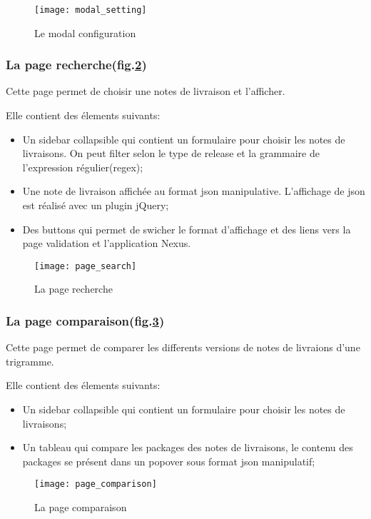 \begin{figure}[ht]
 \centering
 \texttt{[image: modal\_setting]}
 \caption{Le modal configuration}
 \label{fig:modal_setting}
\end{figure}

\subsubsection{La page recherche(fig.\ref{fig:page_search})}
Cette page permet de choisir une notes de livraison et l'afficher.

Elle contient des élements suivants:
\begin{itemize}
 \item Un sidebar collapsible qui contient un formulaire pour choisir les notes de livraisons. On peut filter selon le type de release et la grammaire de l'expression régulier(regex);
 \item Une note de livraison affichée au format json manipulative. L'affichage de json est réalisé avec un plugin jQuery;
 \item Des buttons qui permet de swicher le format d'affichage et des liens vers la page validation et l'application Nexus.
\end{itemize}

\begin{figure}[ht]
 \centering
 \texttt{[image: page\_search]}
 \caption{La page recherche}
 \label{fig:page_search}
\end{figure}

\subsubsection{La page comparaison(fig.\ref{fig:page_comparaison})}
Cette page permet de comparer les differents versions de notes de livraions d'une trigramme.

Elle contient des élements suivants:
\begin{itemize}
 \item Un sidebar collapsible qui contient un formulaire pour choisir les notes de livraisons;
 \item Un tableau qui compare les packages des notes de livraisons, le contenu des packages se présent dans un popover sous format json manipulatif;
\end{itemize}

\begin{figure}[ht]
 \centering
 \texttt{[image: page\_comparison]}
 \caption{La page comparaison}
 \label{fig:page_comparaison}
\end{figure}

